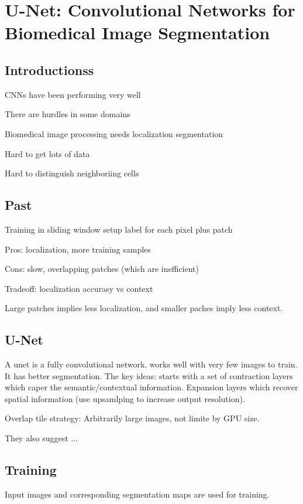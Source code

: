 \section{U-Net: Convolutional Networks for Biomedical Image Segmentation}

\subsection{Introductionss}
CNNs have been performing very well

There are hurdles in some domains

Biomedical image processing needs localization segmentation

Hard to get lots of data

Hard to distinguish neighboriing cells

\subsection{Past}

Training in sliding window setup label for each pixel plus patch

Pros: localization, more training samples

Cons: slow, overlapping patches (which are inefficient)

Tradeoff: localization accurasy vs context

Large patches implies less localization, and smaller paches imply less context.

\subsection{U-Net}

A unet is a fully convolutional network. works well with very few images to
train. It has better segmentation. The key ideas: starts with a set of
contraction layers which caper the semantic/contextual information. Expansion
layers which recover spatial information (use upsamlping to increase output
resolution).

Overlap tile strategy: Arbitrarily large images, not limite by GPU size.


They also suggest ...

\subsection{Training}
Input images and corresponding segmentation maps are used for training.

